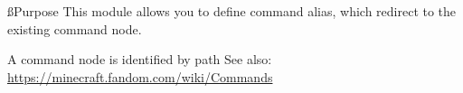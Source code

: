 
\ss{Purpose}
This module allows you to define command alias, which redirect to the existing command node.

\begin{note}{A command node is identified by path}
   See also: \url{https://minecraft.fandom.com/wiki/Commands}
\end{note}
